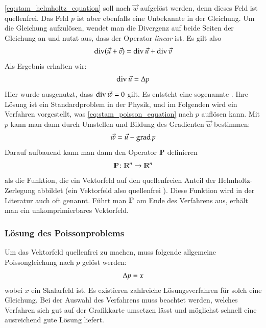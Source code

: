 \autoref{eq:stam_helmholtz_equation} soll nach $\vec{w}$ aufgelöst
werden, denn dieses Feld ist quellenfrei. Das Feld $p$ ist aber
ebenfalls eine Unbekannte in der Gleichung. Um die Gleichung
aufzulösen, wendet man die Divergenz auf beide Seiten der Gleichung an
und nutzt aus, dass der Operator \emph{linear} ist. Es gilt also
\begin{equation}
\operatorname*{div} (\vec{u} + \vec{v}) = \operatorname*{div} \vec{u} + \operatorname*{div} \vec{v}
\end{equation}
Als Ergebnis erhalten wir:
\begin{equation}
\label{eq:stam_poisson_equation}
\operatorname*{div} \vec{u} = \Delta p
\end{equation}
Hier wurde ausgenutzt, dass $\operatorname*{div} \vec{w} = 0$ gilt. Es
entsteht eine sogenannte . Ihre
Lösung ist ein Standardproblem in der Physik, und im Folgenden wird
ein Verfahren vorgestellt, was \autoref{eq:stam_poisson_equation} nach
$p$ auflösen kann. Mit $p$ kann man dann durch Umstellen und Bildung
des Gradienten $\vec{w}$ bestimmen:
\begin{equation}
\vec{w} = \vec{u} - \operatorname*{grad} p
\end{equation}
Darauf aufbauend kann man dann den Operator $\mathbb{P}$ definieren
\begin{equation}
\mathbb{P} \colon \mathbb{R}^n \to \mathbb{R}^n
\end{equation}
als die Funktion, die ein Vektorfeld auf den quellenfreien Anteil der
Helmholtz-Zerlegung abbildet (ein Vektorfeld also quellenfrei
). Diese Funktion wird in der Literatur auch oft
 genannt. Führt man $\mathbb{P}$ am Ende des
Verfahrens aus, erhält man ein unkomprimierbares Vektorfeld.

\subsubsection{Lösung des Poissonproblems}

Um das Vektorfeld quellenfrei zu machen, muss folgende allgemeine
Poissongleichung nach $p$ gelöst werden:
\begin{equation}
\Delta{p} = x
\end{equation}
wobei $x$ ein Skalarfeld ist. Es existieren zahlreiche Lösungsverfahren für solch
eine Gleichung. Bei der Auswahl des Verfahrens muss beachtet werden, welches
Verfahren sich gut auf der Grafikkarte umsetzen lässt und möglichst schnell eine
ausreichend gute Lösung liefert.


